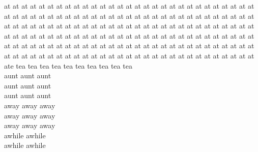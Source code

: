 at at at at at at at at at at at at at at at at at at at at at at at at at at at at at\\
at at at at at at at at at at at at at at at at at at at at at at at at at at at at at\\
at at at at at at at at at at at at at at at at at at at at at at at at at at at at at\\
at at at at at at at at at at at at at at at at at at at at at at at at at at at at at\\
at at at at at at at at at at at at at at at at at at at at at at at at at at at at at\\
at at at at at at at at at at at at at at at at at at at at at at at at at at at at at\\
ate tea tea tea tea tea tea tea tea tea tea\\
aunt aunt aunt\\
aunt aunt aunt\\
aunt aunt aunt\\
away away away\\
away away away\\
away away away\\
awhile awhile\\
awhile awhile\\


